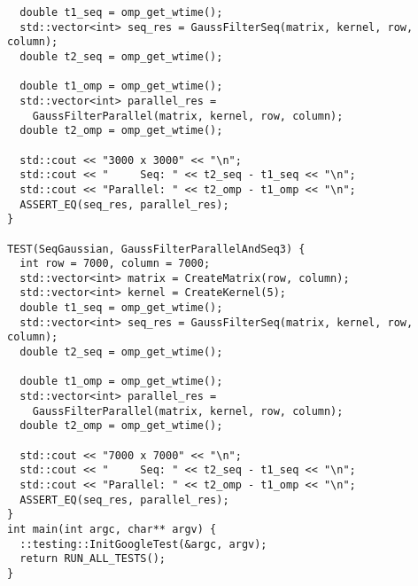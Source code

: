 \documentclass{report}
\begin{document}
\begin{lstlisting}
  double t1_seq = omp_get_wtime();
  std::vector<int> seq_res = GaussFilterSeq(matrix, kernel, row, column);
  double t2_seq = omp_get_wtime();

  double t1_omp = omp_get_wtime();
  std::vector<int> parallel_res =
    GaussFilterParallel(matrix, kernel, row, column);
  double t2_omp = omp_get_wtime();

  std::cout << "3000 x 3000" << "\n";
  std::cout << "     Seq: " << t2_seq - t1_seq << "\n";
  std::cout << "Parallel: " << t2_omp - t1_omp << "\n";
  ASSERT_EQ(seq_res, parallel_res);
}

TEST(SeqGaussian, GaussFilterParallelAndSeq3) {
  int row = 7000, column = 7000;
  std::vector<int> matrix = CreateMatrix(row, column);
  std::vector<int> kernel = CreateKernel(5);
  double t1_seq = omp_get_wtime();
  std::vector<int> seq_res = GaussFilterSeq(matrix, kernel, row, column);
  double t2_seq = omp_get_wtime();

  double t1_omp = omp_get_wtime();
  std::vector<int> parallel_res =
    GaussFilterParallel(matrix, kernel, row, column);
  double t2_omp = omp_get_wtime();

  std::cout << "7000 x 7000" << "\n";
  std::cout << "     Seq: " << t2_seq - t1_seq << "\n";
  std::cout << "Parallel: " << t2_omp - t1_omp << "\n";
  ASSERT_EQ(seq_res, parallel_res);
}
int main(int argc, char** argv) {
  ::testing::InitGoogleTest(&argc, argv);
  return RUN_ALL_TESTS();
}

\end{lstlisting}
\end{document}
